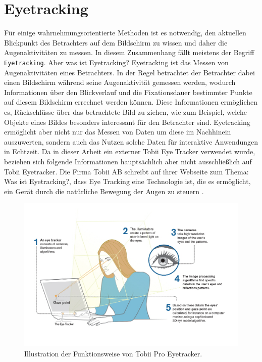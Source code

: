 \section{Eyetracking}\label{sec::eyetr}
Für einige wahrnehmungsorientierte Methoden ist es notwendig, den aktuellen Blickpunkt des Betrachters auf dem Bildschirm zu wissen und daher die Augenaktivitäten zu messen.
In diesem Zusammenhang fällt meistens der Begriff \texttt{Eyetracking}.
Aber was ist Eyetracking?
Eyetracking ist das Messen von Augenaktivitäten eines Betrachters.
In der Regel betrachtet der Betrachter dabei einen Bildschirm während seine Augenaktivität gemessen werden, wodurch Informationen über den Blickverlauf und die Fixationsdauer bestimmter Punkte auf diesem Bildschirm errechnet werden können.
Diese Informationen ermöglichen es, Rückschlüsse über das betrachtete Bild zu ziehen, wie zum Beispiel, welche Objekte eines Bildes besonders interessant für den Betrachter sind.
Eyetracking ermöglicht aber nicht nur das Messen von Daten um diese im Nachhinein auszuwerten, sondern auch das Nutzen solche Daten für interaktive Anwendungen in Echtzeit.
Da in dieser Arbeit ein externer Tobii Eye Tracker verwendet wurde, beziehen sich folgende Informationen hauptsächlich aber nicht ausschließlich auf Tobii Eyetracker.
Die Firma Tobii AB schreibt auf ihrer Webseite zum Thema: Was ist Eyetracking?, dass Eye Tracking eine Technologie ist, die es ermöglicht, ein Gerät durch die natürliche Bewegung der Augen zu steuern \cite{tobii}.
\begin{figure}
	\centering
	\includegraphics[width=1\textwidth]{../../Grafiken/How-20DoesEyetrackingWork_ScreenBased.jpg}
	\caption{Illustration der Funktionsweise von Tobii Pro Eyetracker. \cite{tobiipro}}
	\label{fig::et01}
\end{figure}
